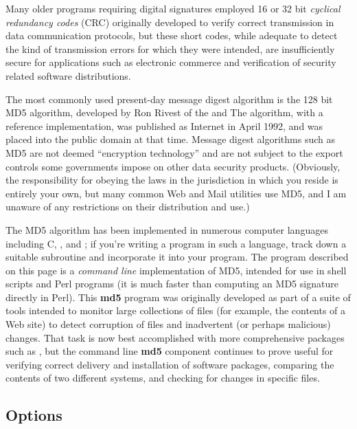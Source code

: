 Many older programs requiring digital signatures employed 16 or 32 bit {\it
cyclical redundancy codes} (CRC) originally developed to verify correct
transmission in data communication protocols, but these short codes, while
adequate to detect the kind of transmission errors for which they were
intended, are insufficiently secure for applications such as electronic
commerce and verification of security related software distributions. 

The most commonly used present-day message digest algorithm is the 128 bit MD5
algorithm, developed by Ron Rivest of the 
 and 
 The algorithm, with a
reference implementation, was published as Internet 
 in April 1992, and
was placed into the public domain at that time. Message digest algorithms such
as MD5 are not deemed ``encryption technology'' and are not subject to the
export controls some governments impose on other data security products.
(Obviously, the responsibility for obeying the laws in the jurisdiction in
which you reside is entirely your own, but many common Web and Mail utilities
use MD5, and I am unaware of any restrictions on their distribution and use.) 

The MD5 algorithm has been implemented in numerous computer languages
including C, 
, and 
; if you're writing a program in such a
language, track down a suitable subroutine and incorporate it into your
program. The program described on this page is a {\it command line}
implementation of MD5, intended for use in shell scripts and Perl programs (it
is much faster than computing an MD5 signature directly in Perl). This {\bf
md5} program was originally developed as part of a suite of tools intended to
monitor large collections of files (for example, the contents of a Web site)
to detect corruption of files and inadvertent (or perhaps malicious) changes.
That task is now best accomplished with more comprehensive packages such as 
, but the
command line {\bf md5} component continues to prove useful for verifying
correct delivery and installation of software packages, comparing the contents
of two different systems, and checking for changes in specific files. 

\subsection{Options}

